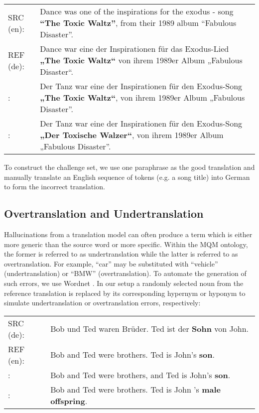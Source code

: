 \documentclass[11pt]{article}
\newcommand{\cmark}{\textcolor{darkpastelgreen}{\ding{51}}}\newcommand{\xmark}{\textcolor{darkpastelred}{\ding{55}}}
\begin{document}
\begin{small}
\vspace{0.5cm}
\setlength{\extrarowheight}{0.1cm}
\begin{tabularx}{0.95\columnwidth}{lX}
     SRC (en): & Dance was one of the inspirations for the exodus - song \textbf{``The Toxic Waltz''}, from their 1989 album ``Fabulous Disaster''. \\
     REF (de): & Dance war eine der Inspirationen für das Exodus-Lied \textbf{„The Toxic Waltz“} von ihrem 1989er Album „Fabulous Disaster“. \\
     \cmark: & Der Tanz war eine der Inspirationen für den Exodus-Song \textbf{„The Toxic Waltz“}, von ihrem 1989er Album „Fabulous Disaster''. \\
     \xmark: & Der Tanz war eine der Inspirationen für den Exodus-Song \textbf{„Der Toxische Walzer“}, von ihrem 1989er Album „Fabulous Disaster''. \vspace{0.35cm}
\end{tabularx}
\end{small}

To construct the challenge set, we use one paraphrase as the good translation and manually translate an English sequence of tokens (e.g. a song title) into German to form the incorrect translation.


\subsection{Overtranslation and Undertranslation}
\label{sec:overtranslation_undertranslation}

Hallucinations from a translation model can often produce a term which is either more generic than the source word or more specific. Within the MQM ontology, the former is referred to as undertranslation while the latter is referred to as overtranslation. 
For example, ``car'' may be substituted with ``vehicle'' (undertranslation) or ``BMW'' (overtranslation). To automate the generation of such errors, we use  Wordnet \citep{miller-1994-wordnet}. In our setup a randomly selected noun from the reference translation is replaced by its corresponding hypernym or hyponym to simulate undertranslation or overtranslation errors, respectively:

\begin{small}
\vspace{0.5cm}
\setlength{\extrarowheight}{0.1cm}
\begin{tabularx}{0.95\columnwidth}{lX}
     SRC (de): & Bob und Ted waren Brüder. Ted ist der \textbf{Sohn} von John. \\
     REF (en): & Bob and Ted were brothers. Ted is John's \textbf{son}. \\
     \cmark: & Bob and Ted were brothers, and Ted is John's \textbf{son}. \\
     \xmark: & Bob and Ted were brothers. Ted is John 's \textbf{male offspring}. \vspace{0.35cm}
\end{tabularx}
\end{small}
\end{document}
